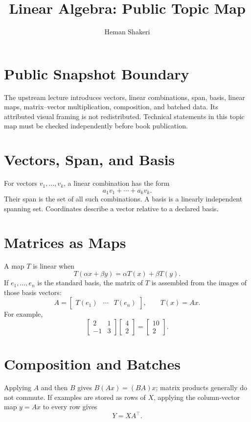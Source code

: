 \documentclass{article}
\title{Linear Algebra: Public Topic Map}
\author{Heman Shakeri}
\date{}
\begin{document}
\maketitle

\section*{Public Snapshot Boundary}

The upstream lecture introduces vectors, linear combinations, span, basis, linear
maps, matrix--vector multiplication, composition, and batched data. Its attributed
visual framing is not redistributed. Technical statements in this topic map must be
checked independently before book publication.

\section{Vectors, Span, and Basis}

For vectors $v_1,\ldots,v_k$, a linear combination has the form
\[
  a_1v_1+\cdots+a_kv_k.
\]
Their span is the set of all such combinations. A basis is a linearly independent
spanning set. Coordinates describe a vector relative to a declared basis.

\section{Matrices as Maps}

A map $T$ is linear when
\[
  T(\alpha x+\beta y)=\alpha T(x)+\beta T(y).
\]
If $e_1,\ldots,e_n$ is the standard basis, the matrix of $T$ is assembled from the
images of those basis vectors:
\[
  A=\begin{bmatrix}T(e_1)&\cdots&T(e_n)\end{bmatrix},
  \qquad T(x)=Ax.
\]
For example,
\[
\begin{bmatrix}2&1\\-1&3\end{bmatrix}
\begin{bmatrix}4\\2\end{bmatrix}
=\begin{bmatrix}10\\2\end{bmatrix}.
\]

\section{Composition and Batches}

Applying $A$ and then $B$ gives $B(Ax)=(BA)x$; matrix products generally do not
commute. If examples are stored as rows of $X$, applying the column-vector map
$y=Ax$ to every row gives
\[
  Y=XA^\top.
\]

\end{document}
